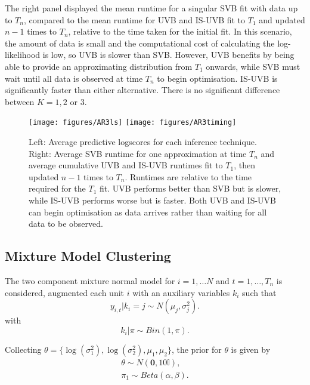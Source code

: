 \documentclass[12pt,a4paper]{article}\usepackage[]{graphicx}\usepackage[]{color}
\begin{document}
The right panel displayed the mean runtime for a singular SVB fit with data up to $T_n$, compared to the mean runtime for UVB and IS-UVB fit to $T_1$ and updated $n-1$ times to $T_n$, relative to the time taken for the initial fit. In this scenario, the amount of data is small and the computational cost of calculating the log-likelihood is low, so UVB is slower than SVB. However, UVB benefits by being able to provide an approximating distribution from $T_1$ onwards, while SVB must wait until all data is observed at time $T_n$ to begin optimisation. IS-UVB is significantly faster than either alternative. There is no significant difference between $K = 1, 2 $ or $3$.   

\begin{figure}[htbp]
    \centering
    {{\texttt{[image: figures/AR3ls]} }}%
    \qquad
    {{\texttt{[image: figures/AR3timing]} }}%
    \caption{Left: Average predictive logscores for each inference technique. Right: Average SVB runtime for one approximation at time $T_n$ and average cumulative UVB and IS-UVB runtimes fit to $T_1$, then updated $n-1$ times to $T_n$. Runtimes are relative to the time required for the $T_1$ fit.
UVB performs better than SVB but is slower, while IS-UVB performs worse but is faster. Both UVB and IS-UVB can begin optimisation as data arrives rather than waiting for all data to be observed.}%
    \label{fig:UVBAR3Timing}%
\end{figure}

\subsection{Mixture Model Clustering}
\label{subsec:UVBMMC}

The two component mixture normal model for $i = 1, \ldots N$ and $t = 1, \ldots, T_n$ is considered, augmented each unit $i$ with an auxiliary variables $k_i$ such that
\begin{equation}
\label{UVB:MMCmixNormalDGP2}
y_{i, t} | k_i = j \sim  N(\mu_j, \sigma^2_{j}).
\end{equation}
with 
\begin{equation}
\label{UVB:MMCkPrior}
k_i | \pi \sim Bin(1, \pi).
\end{equation}

Collecting $\theta = \{\log(\sigma^2_1), \log(\sigma^2_2), \mu_1, \mu_2 \}$, the prior for $\theta$ is given by
\begin{align}
\theta \sim N(\boldsymbol{0}, 10 \mathbb{I}), \\
\pi_1 \sim Beta(\alpha, \beta). \label{UVB:MMCpiPriorMix}
\end{align}
\end{document}
